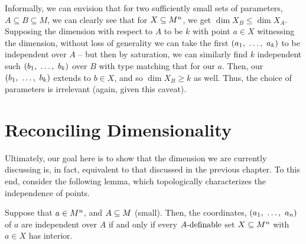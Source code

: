 Informally, we can envision that for two sufficiently small sets of parameters, $A \subseteq B \subseteq M$, we can clearly see that for  $\XMn{n}$, we get $\dim{X}_B \leq \dim{X}_A$. Supposing the dimension with respect to $A$ to be $k$ with point $a \in X$ witnessing the dimension, without loss of generality we can take the first $(\vonevm{a}{k})$ to be independent over $A$ -- but then by saturation, we can similarly find $k$ independent such $(\vonevm{b}{k})$ over $B$ with type matching that for our $a$. Then, our $(\vonevm{b}{k})$ extends to $b \in X$, and so $\dim{X}_B \geq k$ as well. Thus, the choice of parameters is irrelevant (again, given this caveat).

\section{Reconciling Dimensionality}

Ultimately, our goal here is to show that the dimension we are currently discussing is, in fact, equivalent to that discussed in the previous chapter. To this end, consider the following lemma, which topologically characterizes the independence of points.

\begin{lemma}
  Suppose that $\aMn[a]{n}$, and $\AM[A]$ (small). Then, the coordinates, $(\vonevm{a}{n})$ of $a$ are independent over $A$ if and only if every $\Adefnb$ set $\XMn[X]{n}$ with $a \in X$ has \inhb interior.
  \label{lemma:indep_top}
\end{lemma}

